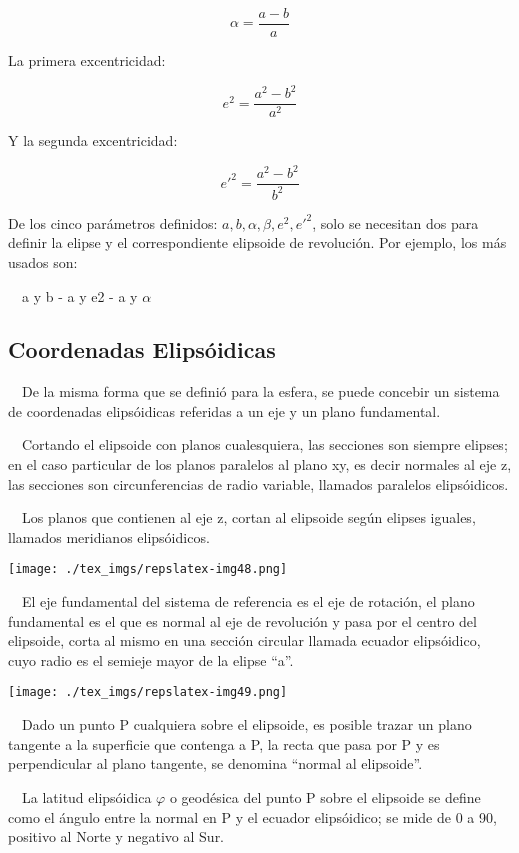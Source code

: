 \documentclass[]{article}
\begin{document}
\[{\alpha =\frac{a-b}{a}}\]

La primera excentricidad:

\[e^2=\frac{a^2-b^2}{a^2}\]

Y la segunda excentricidad:

\[e'^2=\frac{a^2-b^2}{b^2}\]

De los cinco parámetros definidos: \(a,b,\alpha ,\beta ,e^2,e'^2\), solo
se necesitan dos para definir la elipse y el correspondiente elipsoide
de revolución. Por ejemplo, los más usados son:

~~a y b - a y e2 - a y \({\alpha }\)

\hypertarget{coordenadas-elipsuxf3idicas}{%
\subsection{Coordenadas
Elipsóidicas}\label{coordenadas-elipsuxf3idicas}}

~~De la misma forma que se definió para la esfera, se puede concebir un
sistema de coordenadas elipsóidicas referidas a un eje y un plano
fundamental.

~~Cortando el elipsoide con planos cualesquiera, las secciones son
siempre elipses; en el caso particular de los planos paralelos al plano
xy, es decir normales al eje z, las secciones son circunferencias de
radio variable, llamados paralelos elipsóidicos.

~~Los planos que contienen al eje z, cortan al elipsoide según elipses
iguales, llamados meridianos elipsóidicos.

\texttt{[image: ./tex\_imgs/repslatex-img48.png]}

~~El eje fundamental del sistema de referencia es el eje de rotación, el
plano fundamental es el que es normal al eje de revolución y pasa por el
centro del elipsoide, corta al mismo en una sección circular llamada
ecuador elipsóidico, cuyo radio es el semieje mayor de la elipse ``a''.

\texttt{[image: ./tex\_imgs/repslatex-img49.png]}

~~Dado un punto P cualquiera sobre el elipsoide, es posible trazar un
plano tangente a la superficie que contenga a P, la recta que pasa por P
y es perpendicular al plano tangente, se denomina ``normal al
elipsoide''.

~~La latitud elipsóidica \({\varphi }\) o geodésica del punto P sobre el
elipsoide se define como el ángulo entre la normal en P y el ecuador
elipsóidico; se mide de 0 a 90, positivo al Norte y negativo al Sur.
\end{document}
